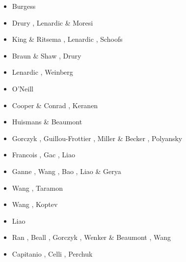 \begin{scriptsize}
\begin{itemize}
\item[\nineteenninetyseven] Burgess \etal \cite{bugm97}
\item[\nineteenninetynine] Drury \etal \cite{drdv99}, Lenardic \& Moresi \cite{lemo99}
\item[\twothousand] King \& Ritsema \cite{kiri00}, Lenardic \etal \cite{lemm00},
                    Schoofs \etal \cite{scth00}
\item[\twothousandone] Braun \& Shaw \cite{brsh01}, Drury \etal \cite{drvc01}
\item[\twothousandthree] Lenardic \etal \cite{lemm03}, Weinberg \etal \cite{wemv03}
\item[\twothousandeight] O'Neill \cite{onlg08}
\item[\twothousandnine] Cooper \& Conrad \cite{coco09}, Keranen \etal \cite{kekj09}
\item[\twothousandeleven] Huismans \& Beaumont \cite{hube11}
\item[\twothousandtwelve] Gorczyk \etal \cite{gohg12}, Guillou-Frottier \etal \cite{gubc12},
                          Miller \& Becker \cite{mibe12}, Polyansky \etal \cite{pokb12}
\item[\twothousandthirteen] Francois \etal \cite{frbm13}, Gac \etal \cite{gahs13},
                            Liao \etal \cite{ligw13}
\item[\twothousandfourteen] Ganne \etal \cite{gagb14}, Wang \etal \cite{wavp14},
                            Bao \etal \cite{baeg14}, Liao \& Gerya \cite{lige14}
\item[\twothousandfifteen] Wang \etal \cite{wahz15,wazh15}, Taramon \etal \cite{tarn15}
\item[\twothousandsixteen] Wang \etal \cite{wahz16}, Koptev \etal \cite{kobc16}
\item[\twothousandseventeen] Liao \etal \cite{liwg17}
\item[\twothousandeighteen] Ran \etal \cite{rabw18}, Beall \etal \cite{bemc18},
                            Gorczyk \etal \cite{gomb18}, Wenker \& Beaumont \cite{webe18b},
                            Wang \etal \cite{wavp18}
\item[\twothousandtwenty] Capitanio \etal \cite{canc20}, Celli \etal \cite{cels20},
                          Perchuk \etal \cite{pegz20}
\end{itemize}
\end{scriptsize}




